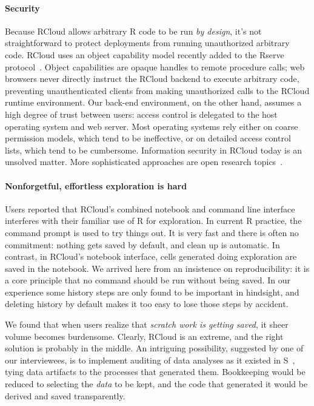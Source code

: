 \paragraph*{Security}
Because RCloud allows arbitrary R code to be run
\emph{by design}, it's not straightforward to protect deployments
from running unauthorized arbitrary code. RCloud uses an object capability model
\cite{Miller:2006:RCT} recently added to the Rserve
protocol~\cite{Urbanek:2003:AFW}. Object capabilities are opaque handles
to remote procedure calls; web browsers never directly instruct the
RCloud backend to execute arbitrary code, preventing unauthenticated clients
from making unauthorized calls to the RCloud runtime environment.
%
Our back-end environment, on the other hand, assumes a high degree of trust between users:
access control is delegated to the host operating system and web server.
Most operating systems rely either on coarse permission models,
which tend to be ineffective, or on detailed access control
lists, which tend to be cumbersome.
Information security in RCloud today is an unsolved matter.
More sophisticated approaches are open research topics~\cite{Moore:2011:SAF}.

\paragraph*{Nonforgetful, effortless exploration is hard}
Users reported that RCloud's combined notebook and command line
interface interferes with their familiar use of R for exploration. In
current R practice, the command prompt is used to try things out. It
is very fast and there is often no commitment: nothing gets saved by
default, and clean up is automatic. In contrast, in RCloud's
notebook interface, cells generated doing exploration are saved in the
notebook. We arrived here from an insistence on reproducibility: it is a
core principle that no command should be run without being
saved. In our experience some history steps are only found to be
important in hindsight, and deleting history by default makes it too
easy to lose those steps by accident.

We found that when users realize that \emph{scratch work
is getting saved}, it sheer volume becomes burdensome.
Clearly, RCloud is an extreme, and the right solution is
probably in the middle. An intriguing possibility,
suggested by one of our interviewees, is to implement auditing of data
analyses as it existed in S~\cite{Becker:1988:Auditing}, tying
data artifacts to the processes that generated them. 
Bookkeeping would be reduced to selecting the \emph{data} to be kept,
and the code that generated it would be derived and saved transparently.

